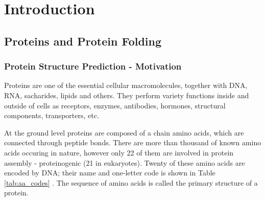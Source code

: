 \chapter{Introduction}

\section{Proteins and Protein Folding}

\subsection{Protein Structure Prediction - Motivation}
    
    
Proteins are one of the essential cellular macromolecules, together with DNA, RNA, sacharides, lipids and others.
They perform variety functions inside and outside of cells as receptors, enzymes, antibodies, hormones, structural components, transporters, etc. 

At the ground level proteins are composed of a chain amino acids, which are connected through peptide bonds. There are more than thousand of known amino acids occuring in nature, however only 22 of them are involved in protein assembly - proteinogenic (21 in eukaryotes). Twenty of these amino acids are encoded by DNA; their name and one-letter code is shown in Table \ref{tab:aa_codes} \cite{protgenaa}. The sequence of amino acids is called the primary structure of a protein.


